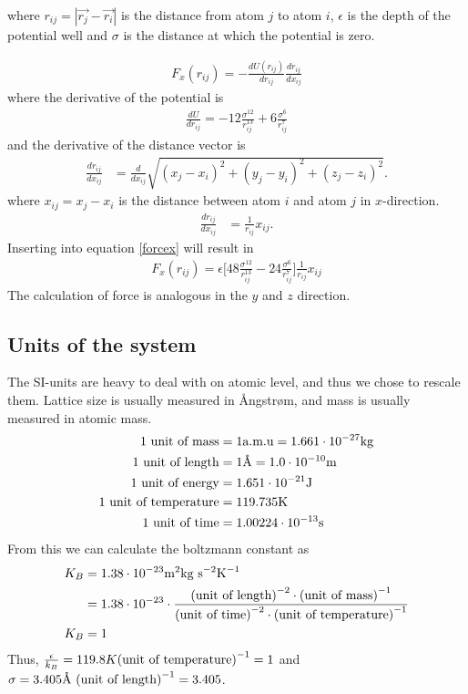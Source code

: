 \documentclass{article}
\begin{document}
where $r_{ij}=|\vec{r_j}-\vec{r_i}|$ is the distance from atom $j$ to atom $i$, $\epsilon$ is the depth of the potential well and $\sigma$ is the distance at which the potential is zero.

\begin{align}
	F_x(r_{ij}) = - \frac{dU(r_{ij})}{dr_{ij}}\frac{dr_{ij}}{dx_{ij}}
	\label{forcex}
\end{align}
where the derivative of the potential is
\begin{align}
	\frac{dU}{dr_{ij}}=-12\frac{\sigma^{12}}{r_{ij}^{13}} + 6 \frac{\sigma^6}{r_{ij}^7}
\end{align}
and the derivative of the distance vector is
\begin{align}
	\frac{dr_{ij}}{dx_{ij}}&=\frac{d}{dx_{ij}}\sqrt{(x_j-x_i)^2+(y_j-y_i)^2+(z_j-z_i)^2}.
\end{align}
where $x_{ij}=x_j-x_i$ is the distance between atom $i$ and atom $j$ in $x$-direction.
\begin{align}
	\frac{dr_{ij}}{dx_{ij}}&=\frac{1}{r_{ij}}x_{ij}.
\end{align}
Inserting into equation \ref{forcex} will result in
\begin{align}
	F_x(r_{ij})= \epsilon \Big[48\frac{\sigma^{12}}{r_{ij}^{13}} - 24 \frac{\sigma^6}{r_{ij}^7}\Big]\frac{1}{r_{ij}}x_{ij}
\end{align}
The calculation of force is analogous in the $y$ and $z$ direction.


\subsection{Units of the system}

The SI-units are heavy to deal with on atomic level, and thus we chose to rescale them. Lattice size is usually measured in Ångstrøm, and mass is usually measured in atomic mass.
\begin{align}
	1 \textnormal{ unit of mass} &= 1 \textnormal{a.m.u} = 1.661\cdot 10^{-27} \textnormal{kg}\\
	1 \textnormal{ unit of length} &= 1 \textnormal{Å} = 1.0\cdot 10^{-10} \textnormal{m}\\
	1 \textnormal{ unit of energy} &= 1.651\cdot 10^{-21}\textnormal{J}\\
	1 \textnormal{ unit of temperature} &= 119.735\textnormal{K}\\
	1 \textnormal{ unit of time} &= 1.00224\cdot 10^{-13} \textnormal{s}
\end{align}
From this we can calculate the boltzmann constant as
\begin{align}
	K_B &= 1.38\cdot 10^{-23} \textnormal{m}^2\textnormal{kg}\textnormal{ s}^{-2}\textnormal{K}^{-1}\\
	&= 1.38\cdot 10^{-23} \cdot \frac{\textnormal{(unit of length)}^{-2}\cdot\textnormal{(unit of mass)}^{-1}}{\textnormal{(unit of time)}^{-2}\cdot\textnormal{(unit of temperature)}^{-1}}\\
	K_B &=1
\end{align}
Thus, $\frac{\epsilon}{k_B}=119.8K \textnormal{(unit of temperature)}^{-1}=1$ and $\sigma = 3.405 \textnormal{Å}\textnormal{ (unit of length)}^{-1} = 3.405$.
\end{document}
